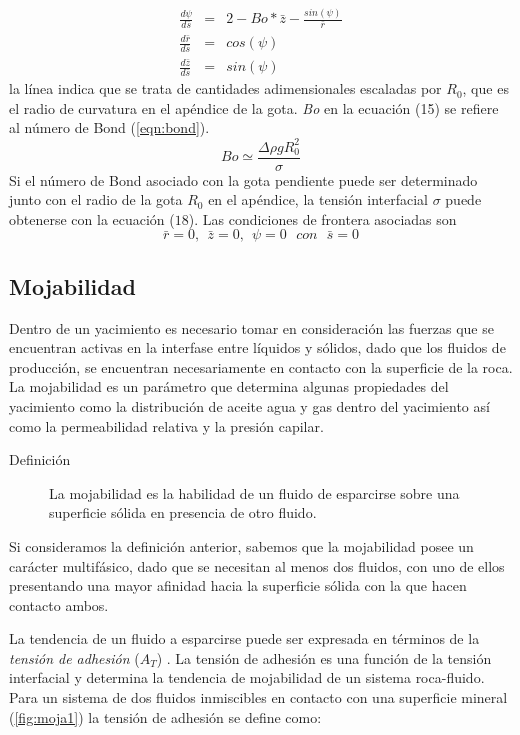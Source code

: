 \begin{eqnarray}
\frac{d\psi}{d\bar{s}} & = & 2-Bo*\bar{z}-\frac{sin(\psi)}{\bar{r}}\\
\frac{d\bar{r}}{d\bar{s}} & = & cos(\psi) \\
\frac{d\bar{z}}{d\bar{s}} & = & sin(\psi)
\end{eqnarray}
la línea indica que se trata de cantidades adimensionales escaladas por $R_{0}$, que es el radio de curvatura en el apéndice de la gota. \emph{Bo} en la ecuación (15) se refiere al número de Bond (\autoref{eqn:bond}).
\begin{equation}
Bo \simeq \frac{\Delta \rho g R_{0}^{2}}{\sigma}
\label{eqn:bond}
\end{equation}
Si el número de Bond asociado con la gota pendiente puede ser determinado junto con el radio de la gota $R_{0}$ en el apéndice, la tensión interfacial $\sigma$ puede obtenerse con la ecuación ($18$). Las condiciones de frontera asociadas son 
\begin{equation}
\bar{r}=0 ,~~ \bar{z}=0,~~ \psi=0 ~~~con~~~ \bar{s}=0
\end{equation}

\subsection{Mojabilidad}%
Dentro de un yacimiento es necesario tomar en consideración las fuerzas que se encuentran activas en la interfase entre líquidos y sólidos, dado que los fluidos de producción, se encuentran necesariamente en contacto con la superficie de la roca. La mojabilidad es un parámetro que determina algunas propiedades del yacimiento como la distribución de aceite agua y gas dentro del yacimiento así como la permeabilidad relativa y la presión capilar.

\begin{description}
    \item[Definición] La mojabilidad es la habilidad de un fluido de esparcirse sobre una superficie sólida en presencia de otro fluido.
\end{description}

Si consideramos la definición anterior, sabemos que la mojabilidad posee un carácter multifásico, dado que se necesitan al menos dos fluidos, con uno de ellos presentando una mayor afinidad hacia la superficie sólida con la que hacen contacto ambos.

La tendencia de un fluido a esparcirse puede ser expresada en términos de la \emph{tensión de adhesión} ($A_{T}$) . La tensión de adhesión es una función de la tensión interfacial y determina la tendencia de mojabilidad de un sistema roca-fluido. Para un sistema de dos fluidos inmiscibles en contacto con una superficie mineral (\autoref{fig:moja1}) la tensión de adhesión se define como:

